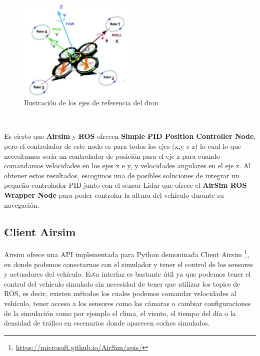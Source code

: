 \begin{figure} [H]
  \begin{center}
    \includegraphics[width=0.5\textwidth,height=0.4\textwidth]{figs/Plataformas_Desarollo/dron_vechicle.jpg}
  \end{center}
  \caption{Ilustración de los ejes de referencia del dron}
  \label{fig:dron}
\end{figure}\

Es cierto que \textbf{Airsim} y \textbf{ROS} ofrecen \textbf{Simple PID Position Controller Node}, pero el controlador de este nodo es para todos los ejes (x,y e z) 
lo cual lo que necesitamos sería un controlador de posición para el eje z para cuando comandamos velocidades en los ejes x e y, y velocidades angulares en el eje z. 
Al obtener estos resultados, escogimos una de posibles soluciones de integrar un pequeño controlador PID junto con el sensor Lidar que ofrece el \textbf{AirSim ROS Wrapper Node} 
para poder controlar la altura del vehículo durante su navegación. 

\subsection{Client Airsim}
\label{sec:Client Airsim}

Airsim ofrece una API implementada para Python demoninada Client Airsim \footnote{\url{https://microsoft.github.io/AirSim/apis/}}, en donde podemos conectarnos con el simulador y tener el control de los sensores y actuadores del vehículo. 
Esta interfaz es bastante útil ya que podemos tener el control del vehículo simulado sin necesidad de tener que utilizar los topics de ROS, es decir, existen métodos los cuales
podemos comandar velocidades al vehículo, tener acceso a los sensores como las cámaras o cambiar configuraciones de la simulación como por ejemplo el clima, el viento, el tiempo del día
o la densidad de tráfico en escenarios donde aparecen coches simulados. \newline

